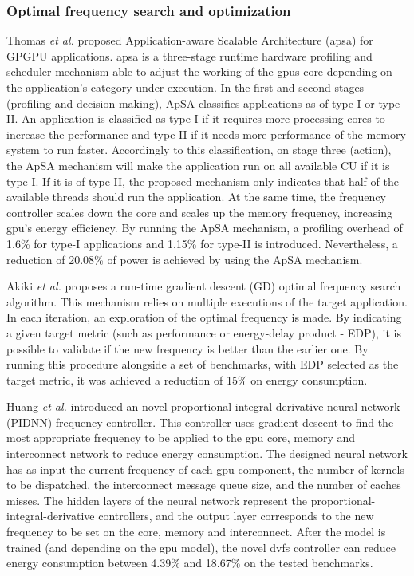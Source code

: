 \subsubsection{Optimal frequency search and optimization}

Thomas \textit{et al.} \cite{thomas_application_2018} proposed Application-aware Scalable Architecture (\acrshort{apsa}) for GPGPU applications. \acrshort{apsa} is a three-stage runtime hardware profiling and scheduler mechanism able to adjust the working of the \acrshort{gpu}s core depending on the application's category under execution. In the first and second stages (profiling and decision-making), ApSA classifies applications as of type-I or type-II. An application is classified as type-I if it requires more processing cores to increase the performance and type-II if it needs more performance of the memory system to run faster. Accordingly to this classification, on stage three (action), the ApSA mechanism will make the application run on all available CU if it is type-I. If it is of type-II, the proposed mechanism only indicates that half of the available threads should run the application. At the same time, the frequency controller scales down the core and scales up the memory frequency, increasing \acrshort{gpu}'s energy efficiency. By running the ApSA mechanism, a profiling overhead of 1.6\% for type-I applications and 1.15\% for type-II is introduced. Nevertheless, a reduction of 20.08\% of power is achieved by using the ApSA mechanism.




Akiki \textit{et al.} \cite{akiki_energy-aware_2018} proposes a run-time gradient descent (GD) optimal frequency search algorithm. This mechanism relies on multiple executions of the target application. In each iteration, an exploration of the optimal frequency is made. By indicating a given target metric (such as performance or energy-delay product - EDP), it is possible to validate if the new frequency is better than the earlier one. By running this procedure alongside a set of benchmarks, with EDP selected as the target metric, it was achieved a reduction of 15\% on energy consumption.

Huang \textit{et al.} \cite{huang_gpu_2019} introduced an novel proportional-integral-derivative neural network (PIDNN) frequency controller. This controller uses gradient descent to find the most appropriate frequency to be applied to the \acrshort{gpu} core, memory and interconnect network to reduce energy consumption. The designed neural network has as input the current frequency of each \acrshort{gpu} component, the number of kernels to be dispatched, the interconnect message queue size, and the number of caches misses. The hidden layers of the neural network represent the proportional-integral-derivative controllers, and the output layer corresponds to the new frequency to be set on the core, memory and interconnect. After the model is trained (and depending on the \acrshort{gpu} model), the novel \acrshort{dvfs} controller can reduce energy consumption between 4.39\% and 18.67\% on the tested benchmarks.




